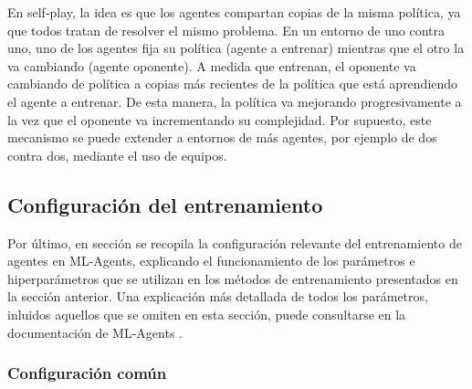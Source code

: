 En self-play, la idea es que los agentes compartan copias de la misma política, ya que todos tratan de resolver el mismo problema. En un entorno de uno contra uno, uno de los agentes fija su política (agente a entrenar) mientras que el otro la va cambiando (agente oponente). A medida que entrenan, el oponente va cambiando de política a copias más recientes de la política que está aprendiendo el agente a entrenar. De esta manera, la política va mejorando progresivamente a la vez que el oponente va incrementando su complejidad. Por supuesto, este mecanismo se puede extender a entornos de más agentes, por ejemplo de dos contra dos, mediante el uso de equipos.

\subsection{Configuración del entrenamiento}

Por último, en sección se recopila la configuración relevante del entrenamiento de agentes en ML-Agents, explicando  el funcionamiento de los parámetros e hiperparámetros que se utilizan en los métodos de entrenamiento presentados en la sección anterior. Una explicación más detallada de todos los parámetros, inluidos aquellos que se omiten en esta sección, puede consultarse en la documentación de ML-Agents \cite{ml-agents-config-file}.

\subsubsection{Configuración común}

